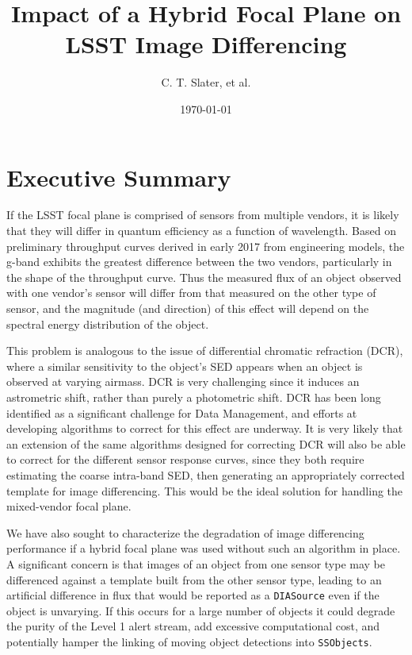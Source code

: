 \documentclass[12pt]{article}
\title{Impact of a Hybrid Focal Plane on LSST Image Differencing}
\author{C. T. Slater, et al. }
\newcommand{\code}[1]{\texttt{#1}}
\newcommand{\DIASource}{\code{DIASource}\xspace}
\newcommand{\SSObjects}{\code{SSObjects}\xspace}
\begin{document}
\date{\today}
\maketitle


\section{Executive Summary}

If the LSST focal plane is comprised of sensors from multiple vendors, it is
likely that they will differ in quantum efficiency as a function of wavelength.
Based on preliminary throughput curves derived in early 2017 from engineering
models, the g-band exhibits the greatest difference between the two vendors,
particularly in the shape of the throughput curve. Thus the measured flux of an
object observed with one vendor's sensor will differ from that measured on the
other type of sensor, and the magnitude (and direction) of this effect will
depend on the spectral energy distribution of the object.

This problem is analogous to the issue of differential chromatic refraction (DCR),
where a similar sensitivity to the object's SED appears when an object is
observed at varying airmass. DCR is very challenging since it induces an
astrometric shift, rather than purely a photometric shift. DCR has been long
identified as a significant challenge for Data Management, and efforts at
developing algorithms to correct for this effect are underway. It is very likely
that an extension of the same algorithms designed for correcting DCR will also
be able to correct for the different sensor response curves, since they both
require estimating the coarse intra-band SED, then generating an appropriately
corrected template for image differencing. This would be the ideal solution for
handling the mixed-vendor focal plane.

We have also sought to characterize the degradation of image differencing
performance if a hybrid focal plane was used without such an algorithm in place.
A significant concern is that images of an object from one sensor type may be
differenced against a template built from the other sensor type, leading to an
artificial difference in flux that would be reported as a \DIASource even if the
object is unvarying. If this occurs for a large number of objects it could
degrade the purity of the Level 1 alert stream, add excessive computational
cost, and potentially hamper the linking of moving object detections into
\SSObjects.
\end{document}
